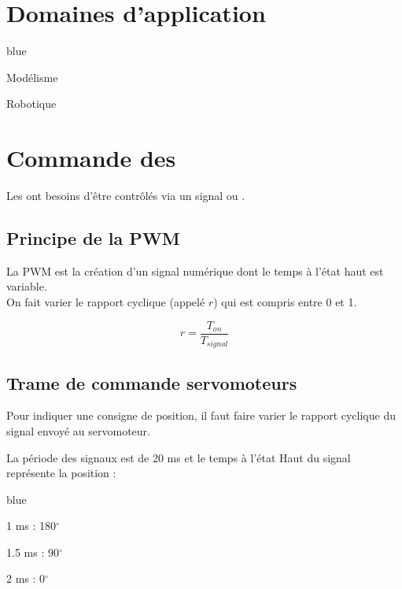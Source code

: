 \section{Domaines d'application}

\begin{items}{blue}{\Bullet}
    \item Modélisme
    \item Robotique
\end{items}

\section{Commande des \servo}

Les \servo ont besoins d'être contrôlés via un signal  ou . %

\subsection{Principe de la PWM}

La PWM est la création d'un signal numérique dont le temps à l'état haut est variable.\\
On fait varier le rapport cyclique (appelé $r$) qui est compris entre 0 et 1.

$$ r = \frac{T_{on}}{T_{signal}} $$



\subsection{Trame de commande servomoteurs}

Pour indiquer une consigne de position, il faut faire varier le rapport cyclique 
du signal envoyé au servomoteur.

La période des signaux est de 20 ms et le temps à l'état Haut du signal représente la position : 

\begin{items}{blue}{\Triangle}
\item 1 ms : 180$^\circ$
\item 1.5 ms : 90$^\circ$
\item 2 ms : 0$^\circ$
\end{items}


